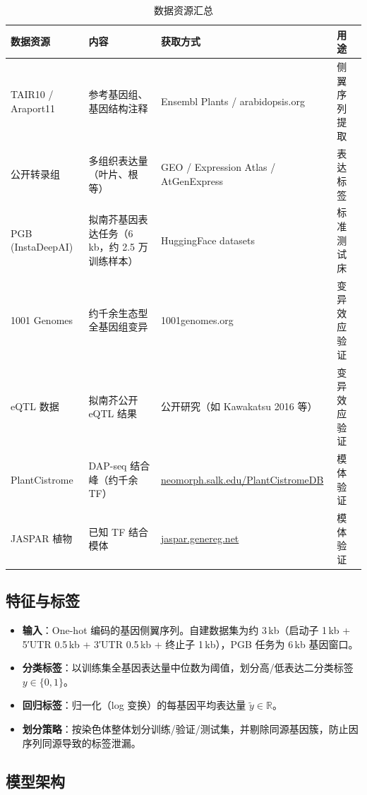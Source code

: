 \documentclass[UTF8,11pt,a4paper]{ctexart}
\begin{document}
\begin{table}[htbp]
\centering
\caption{数据资源汇总}
\label{tab:data}
\small
\begin{tabular}{@{}p{3.0cm}p{4.6cm}p{3.4cm}p{2.8cm}@{}}
\toprule
\textbf{数据资源} & \textbf{内容} & \textbf{获取方式} & \textbf{用途} \\
\midrule
TAIR10 / Araport11 & 参考基因组、基因结构注释 & Ensembl Plants / arabidopsis.org & 侧翼序列提取 \\
公开转录组 & 多组织表达量（叶片、根等） & GEO / Expression Atlas / AtGenExpress & 表达标签 \\
PGB (InstaDeepAI) & 拟南芥基因表达任务（6\,kb，约 2.5 万训练样本） & HuggingFace datasets & 标准测试床 \\
1001 Genomes & 约千余生态型全基因组变异 & 1001genomes.org & 变异效应验证 \\
eQTL 数据 & 拟南芥公开 eQTL 结果 & 公开研究（如 Kawakatsu 2016 等） & 变异效应验证 \\
PlantCistrome & DAP-seq 结合峰（约千余 TF） & \url{neomorph.salk.edu/PlantCistromeDB} & 模体验证 \\
JASPAR 植物 & 已知 TF 结合模体 & \url{jaspar.genereg.net} & 模体验证 \\
\bottomrule
\end{tabular}
\end{table}

\subsection{特征与标签}
\label{sec:method-feat}

\begin{itemize}
\item \textbf{输入}：One-hot 编码的基因侧翼序列。自建数据集为约 3\,kb（启动子 1\,kb + 5′UTR 0.5\,kb + 3′UTR 0.5\,kb + 终止子 1\,kb），PGB 任务为 6\,kb 基因窗口。
\item \textbf{分类标签}：以训练集全基因表达量中位数为阈值，划分高/低表达二分类标签 $y \in \{0,1\}$。
\item \textbf{回归标签}：归一化（log 变换）的每基因平均表达量 $\tilde{y} \in \mathbb{R}$。
\item \textbf{划分策略}：按染色体整体划分训练/验证/测试集，并剔除同源基因簇，防止因序列同源导致的标签泄漏\cite{peleke2024}。
\end{itemize}

\subsection{模型架构}
\label{sec:method-model}
\end{document}
